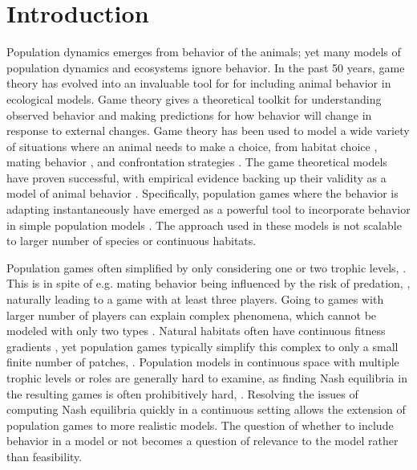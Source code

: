 \section{Introduction}
Population dynamics emerges from behavior of the animals; yet many models of population dynamics and ecosystems ignore behavior.  In the past 50 years, game theory has evolved into an invaluable tool for for including animal behavior in ecological models. Game theory gives a theoretical toolkit for understanding observed behavior and making predictions for how behavior will change in response to external changes. Game theory has been used to model a wide variety of situations where an animal needs to make a choice, from habitat choice \citep{krivan1997dynamic, kondoh2003foraging,kvrivan2008ideal}, mating behavior  \citep{rapoport1967exploiter}, and confrontation strategies \citep{smith1973logic}. The game theoretical models have proven successful, with empirical evidence backing up their validity as a model of animal behavior \citep{cooper1989communication,empirical_trait,behavioral_effects}. Specifically, population games where the behavior is adapting instantaneously have emerged as a powerful tool to incorporate behavior in simple population models \citep{Krivan1998,genkai2007macrophyte, cressman2010ideal,pinti2021co, abrams2007role}. The approach used in these models is not scalable to larger number of species or continuous habitats.



Population games often simplified by only considering  one or two trophic levels, \citep{cressman2010ideal, abrams2007role, sadowski2019predator}. This is in spite of e.g. mating behavior being influenced by the risk of predation, \citep{carranza1999red,lima2009predators}, naturally leading to a game with at least three players. Going to games with larger number of players can explain complex phenomena, which cannot be modeled with only two types \citep{pinti2019trophic}. Natural habitats often have continuous fitness gradients \citep{kawecki2004conceptual}, yet population games typically simplify this complex to only a small finite number of patches, \cite{valdovinos2010consequences}. Population models in continuous space with multiple trophic levels or roles are generally hard to examine, as finding Nash equilibria in the resulting games is often prohibitively hard, \citep{empirical_trait,pinti2019trophic}. Resolving the issues of computing Nash equilibria quickly in a continuous setting allows the extension of population games to more realistic models. The question of whether to include behavior in a model or not becomes a question of relevance to the model rather than feasibility.


